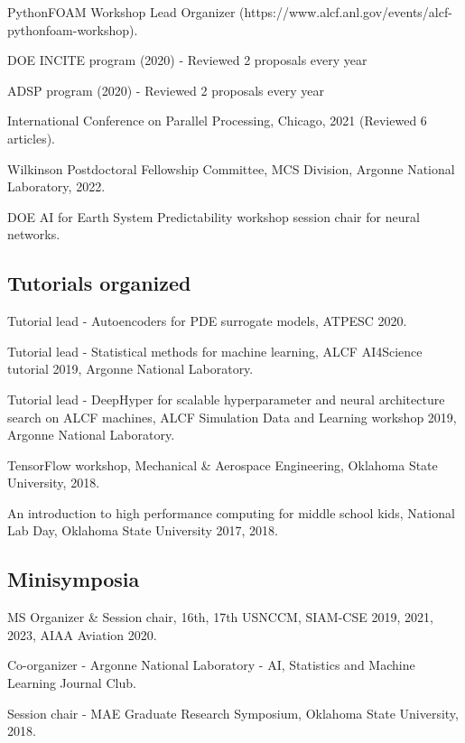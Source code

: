 \documentclass[letterpaper]{article}
\renewenvironment{itemize}{
  \begin{list}{}{
    \setlength{\leftmargin}{1.5em}
  }
}{
  \end{list}
}
\begin{document}
\begin{itemize}
\item PythonFOAM Workshop Lead Organizer (https://www.alcf.anl.gov/events/alcf-pythonfoam-workshop).
\item DOE INCITE program (2020) - Reviewed 2 proposals every year
\item ADSP program (2020) - Reviewed 2 proposals every year
\item International Conference on Parallel Processing, Chicago, 2021 (Reviewed 6 articles).
\item Wilkinson Postdoctoral Fellowship Committee, MCS Division, Argonne National Laboratory, 2022.
\item DOE AI for Earth System Predictability workshop session chair for neural networks.
\end{itemize}

\subsection*{Tutorials organized}

\begin{itemize}
  \item Tutorial lead - Autoencoders for PDE surrogate models, ATPESC 2020.
  \item Tutorial lead - Statistical methods for machine learning, ALCF AI4Science tutorial 2019, Argonne National Laboratory.
  \item Tutorial lead - DeepHyper for scalable hyperparameter and neural architecture search on ALCF machines, ALCF Simulation Data and Learning workshop 2019, Argonne National Laboratory.
  \item TensorFlow workshop, Mechanical \& Aerospace Engineering, Oklahoma State University, 2018.
  \item An introduction to high performance computing for middle school kids, National Lab Day, Oklahoma State University 2017, 2018.
\end{itemize}

\subsection*{Minisymposia}

\begin{itemize}
  \item MS Organizer \& Session chair, 16th, 17th USNCCM, SIAM-CSE 2019, 2021, 2023, AIAA Aviation 2020.
  \item Co-organizer - Argonne National Laboratory - AI, Statistics and Machine Learning Journal Club.
  \item Session chair - MAE Graduate Research Symposium, Oklahoma State University, 2018.
\end{itemize}
\end{document}
